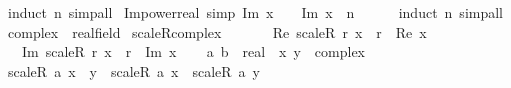 \begin{isabellebody}
%
\isatagproof
{}\isamarkupfalse%
\ {\isacharparenleft}{\kern0pt}induct\ n{\isacharparenright}{\kern0pt}\ simp{\isacharunderscore}{\kern0pt}all%
\endisatagproof
{\isafoldproof}%
%
\isadelimproof
\isanewline
%
\endisadelimproof
\isanewline
{}\isamarkupfalse%
\ Im{\isacharunderscore}{\kern0pt}power{\isacharunderscore}{\kern0pt}real\ {\isacharbrackleft}{\kern0pt}simp{\isacharbrackright}{\kern0pt}{\isacharcolon}{\kern0pt}\ {\isachardoublequoteopen}Im\ x\ {\isacharequal}{\kern0pt}\ {}\ {\isasymLongrightarrow}\ Im\ {\isacharparenleft}{\kern0pt}x\ {\isacharcircum}{\kern0pt}\ n{\isacharparenright}{\kern0pt}\ {\isacharequal}{\kern0pt}\ {}{\isachardoublequoteclose}\isanewline
%
\isadelimproof
\ \ %
\endisadelimproof
%
\isatagproof
{}\isamarkupfalse%
\ {\isacharparenleft}{\kern0pt}induct\ n{\isacharparenright}{\kern0pt}\ simp{\isacharunderscore}{\kern0pt}all%
\endisatagproof
{\isafoldproof}%
%
\isadelimproof
%
\endisadelimproof
%
\isadelimdocument
%
\endisadelimdocument
%
\isatagdocument
%
\isamarkuptrue%
%
\endisatagdocument
{\isafolddocument}%
%
\isadelimdocument
%
\endisadelimdocument
{}\isamarkupfalse%
\ complex\ {\isacharcolon}{\kern0pt}{\isacharcolon}{\kern0pt}\ real{\isacharunderscore}{\kern0pt}field\isanewline
{}\isanewline
\isanewline
{}\isamarkupfalse%
\ scaleR{\isacharunderscore}{\kern0pt}complex\isanewline
\ \ \isanewline
\ \ \ \ {\isachardoublequoteopen}Re\ {\isacharparenleft}{\kern0pt}scaleR\ r\ x{\isacharparenright}{\kern0pt}\ {\isacharequal}{\kern0pt}\ r\ {\isacharasterisk}{\kern0pt}\ Re\ x{\isachardoublequoteclose}\isanewline
\ \ {\isacharbar}{\kern0pt}\ {\isachardoublequoteopen}Im\ {\isacharparenleft}{\kern0pt}scaleR\ r\ x{\isacharparenright}{\kern0pt}\ {\isacharequal}{\kern0pt}\ r\ {\isacharasterisk}{\kern0pt}\ Im\ x{\isachardoublequoteclose}\isanewline
\isanewline
{}\isamarkupfalse%
\isanewline
%
\isadelimproof
%
\endisadelimproof
%
\isatagproof
{}\isamarkupfalse%
\isanewline
\ \ \isamarkupfalse%
\ a\ b\ {\isacharcolon}{\kern0pt}{\isacharcolon}{\kern0pt}\ real\ \ x\ y\ {\isacharcolon}{\kern0pt}{\isacharcolon}{\kern0pt}\ complex\isanewline
\ \ \isamarkupfalse%
\ {\isachardoublequoteopen}scaleR\ a\ {\isacharparenleft}{\kern0pt}x\ {\isacharplus}{\kern0pt}\ y{\isacharparenright}{\kern0pt}\ {\isacharequal}{\kern0pt}\ scaleR\ a\ x\ {\isacharplus}{\kern0pt}\ scaleR\ a\ y{\isachardoublequoteclose}\isanewline

\end{isabellebody}
